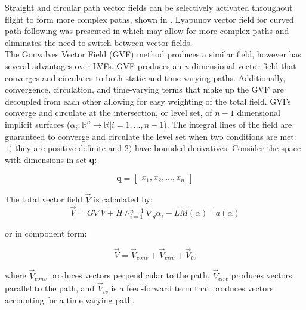 \documentclass[conf]{new-aiaa}
\begin{document}
Straight and circular path vector fields can be selectively activated throughout flight to form more complex paths, shown in \cite{nelson_cooperative_2005,nelson_vector_2006,nelson_vector_2007,jung_unmanned_2016}. Lyapunov vector field for curved path following was presented in \cite{griffiths_vector_2006} which may allow for more complex paths and eliminates the need to switch between vector fields. \\

The Gonvalves Vector Field (GVF) method produces a similar field, however has several advantages over LVFs. GVF produces an \textit{n}-dimensional vector field that converges and circulates to both static and time varying paths. Additionally, convergence, circulation, and time-varying terms that make up the GVF are decoupled from each other allowing for easy weighting of the total field. GVFs converge and circulate at the intersection, or level set, of $n-1$ dimensional implicit surfaces ($\alpha_i:\mathbb{R}^n\rightarrow\mathbb{R} | i=1,...,n-1$). The integral lines of the field are guaranteed to converge and circulate the level set when two conditions are met: $1)$ they are positive definite and $2)$ have bounded derivatives. Consider the space with dimensions in set \textbf{q}:



\begin{equation}
\mathbf{q} = \begin{bmatrix} x_1, x_2, ..., x_{n}\end{bmatrix}
\end{equation}

The total vector field $\overrightarrow{V}$ is calculated by:
\begin{equation}\label{eq:GVF}
\overrightarrow{V} = G \nabla V + H \wedge_{i=1}^{n-1}\nabla_q\alpha_i  - LM(\alpha)^{-1} a(\alpha)
\end{equation}

or in component form:

\begin{equation}\label{simpleGVF}
\vec{V} = \vec{V}_{conv} + \vec{V}_{circ} + \vec{V}_{tv} 
\end{equation}	

where $\vec{V}_{conv}$ produces vectors perpendicular to the path, $\vec{V}_{circ}$ produces vectors parallel to the path, and $\vec{V}_{tv}$ is a feed-forward term that produces vectors accounting for a time varying path. 
\end{document}
